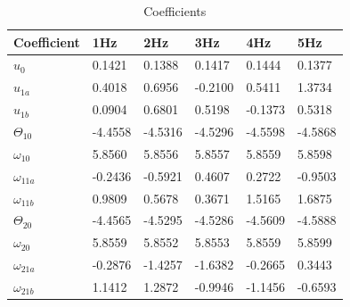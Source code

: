 \documentclass[11pt,titlepage]{article}
\begin{document}
		\begin{table}[H]
			\centering
			\begin{tabular}{|m{2cm}|m{2cm}|m{2cm}|m{2cm}|m{2cm}|m{2cm}|} 
			\hline
			Coefficient & 1Hz & 2Hz & 3Hz & 4Hz & 5Hz \\ 
			\hline
			$u_0$ & 0.1421 & 0.1388 & 0.1417 & 0.1444 & 0.1377 \\
			\hline
			$u_{1a}$ & 0.4018 & 0.6956 & -0.2100 & 0.5411 & 1.3734 \\
			\hline
			$u_{1b}$ & 0.0904 & 0.6801 & 0.5198 & -0.1373 & 0.5318 \\
			\hline
			$\Theta_{10}$ & -4.4558 & -4.5316 & -4.5296 & -4.5598 & -4.5868 \\
			\hline
			$\omega_{10}$ & 5.8560 & 5.8556 & 5.8557 & 5.8559 & 5.8598 \\
			\hline
			$\omega_{11a}$ & -0.2436 & -0.5921 & 0.4607 & 0.2722 & -0.9503 \\
			\hline
			$\omega_{11b}$ & 0.9809 & 0.5678 & 0.3671 & 1.5165 & 1.6875 \\
			\hline
			$\Theta_{20}$ & -4.4565 & -4.5295 & -4.5286 & -4.5609 & -4.5888 \\
			\hline
			$\omega_{20}$ & 5.8559 & 5.8552 & 5.8553 & 5.8559 & 5.8599 \\
			\hline
			$\omega_{21a}$ & -0.2876 & -1.4257 & -1.6382 & -0.2665 & 0.3443 \\
			\hline
			$\omega_{21b}$ & 1.1412 & 1.2872 & -0.9946 & -1.1456 & -0.6593 \\
			\hline
			\end{tabular}
			\caption{Coefficients} \label{table:coeff}
		\end{table}
\end{document}
